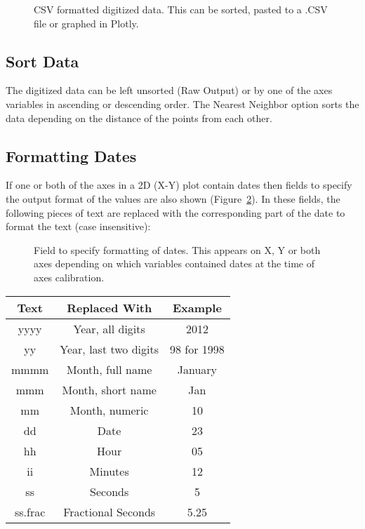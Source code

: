\documentclass[letterpaper, 11pt]{article}
\begin{document}
\begin{figure}
\begin{center}
\caption{CSV formatted digitized data. This can be sorted, pasted to a .CSV file or graphed in Plotly.}
\label{fig:csvOutput}
\end{center}
\end{figure}

\subsection{Sort Data}
The digitized data can be left unsorted (Raw Output) or by one of the axes variables in ascending or descending order. The Nearest Neighbor option sorts the data depending on the distance of the points from each other.

\subsection{Formatting Dates}
\label{sec:formattingDatesCSV}
If one or both of the axes in a 2D (X-Y) plot contain dates then fields to specify the output format of the values are also shown (Figure~\ref{fig:dateFormat}). In these fields, the following pieces of text are replaced with the corresponding part of the date to format the text (case insensitive):

\begin{figure}
\begin{center}
\caption{Field to specify formatting of dates. This appears on X, Y or both axes depending on which variables contained dates at the time of axes calibration.}
\label{fig:dateFormat}
\end{center}
\end{figure}


\begin{center}
\begin{tabular}{|c|c|c|}
\hline
Text & Replaced With & Example\\
\hline
yyyy & Year, all digits & 2012\\
yy & Year, last two digits & 98 for 1998\\
mmmm & Month, full name & January\\
mmm & Month, short name & Jan\\
mm & Month, numeric & 10\\
dd & Date & 23\\
hh & Hour & 05\\
ii & Minutes & 12\\
ss & Seconds & 5\\
ss.frac & Fractional Seconds & 5.25\\
\hline
\end{tabular}
\end{center}
\end{document}
